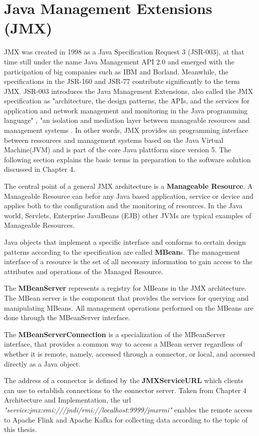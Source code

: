 \section{{Java Management Extensions (JMX)}}

JMX was created in 1998 as a Java Specification Request 3 (JSR-003), at that time still
under the name Java Management API 2.0 and emerged with the participation of big
companies such as IBM and Borland. Meanwhile, the specifications in the JSR-160 and
JSR-77 contribute significantly to the term JMX. JSR-003 introduces the Java Management
Extensions, also called the JMX specification as "architecture, the design patterns,
the APIs, and the services for application and network management and monitoring in
the Java programming language" \cite{Sun13}, "an isolation and mediation layer between manageable
resources and management systems \cite{Kreg03}. In other words, JMX provides an programming interface between ressources
and management systems based on the Java Virtual Machine(JVM) and is part of the core Java plattform since
version 5. The following section explains the basic terms in preparation to the software solution discussed
in Chapter 4.

The central point of a general JMX architecture is a \textbf{Manageable Resource}.
A Manageable Resource can befor any Java based application, service or device and
applies both to the configuration and the monitoring of resources. In the Java world,
Servlets, Enterprise JavaBeans (EJB) other JVMs are typical examples of Manageable Resources.

Java objects that implement a specific interface and conforms to certain design patterns according
to the specification are called \textbf{MBean}s. The management interface of a resource is the
set of all necessary information to gain access to the attributes and operations of the Managed Resource.

The \textbf{MBeanServer} represents a registry for MBeans in the JMX architecture. The MBean server is the
component that provides the services for querying and manipulating MBeans. All management operations performed on the
MBeans are done through the MBeanServer interface.

The \textbf{MBeanServerConnection} is a specialization of the MBeanServer interface, that provides a common way to
access a MBean server regardless of whether it is remote, namely, accessed through a connector, or local, and accessed
directly as a Java object.

The address of a connector is defined by the \textbf{JMXServiceURL} which clients can use to establish connections
to the connector server. Taken from Chapter 4 Architecture and Implementation, the url \textit{"service:jmx:rmi:///jndi/rmi://localhost:9999/jmxrmi"}
enables the remote access to Apache Flink and Apache Kafka for collecting data according to the topic of this thesis.

